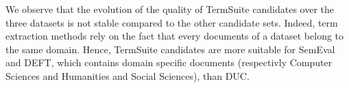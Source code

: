       We observe that the evolution of the quality of TermSuite candidates over
      the three datasets is not stable compared to the other candidate sets.
      Indeed, term extraction methods rely on the fact that every documents of a
      dataset belong to the same domain. Hence, TermSuite candidates are more
      suitable for SemEval and DEFT, which contains domain specific documents
      (respectivly Computer Sciences and Humanities and Social Sciences), than
      DUC.

